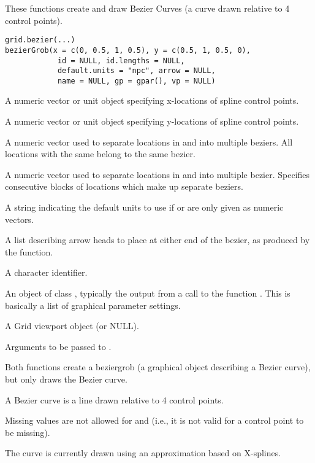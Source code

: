 %
\begin{Description}\relax
These functions create and draw Bezier Curves (a curve drawn
relative to 4 control points).
\end{Description}
%
\begin{Usage}
\begin{verbatim}
grid.bezier(...)
bezierGrob(x = c(0, 0.5, 1, 0.5), y = c(0.5, 1, 0.5, 0),
            id = NULL, id.lengths = NULL,
            default.units = "npc", arrow = NULL, 
            name = NULL, gp = gpar(), vp = NULL)
\end{verbatim}
\end{Usage}
%
\begin{Arguments}
\begin{ldescription}
\item[\code{x}] A numeric vector or unit object specifying x-locations of
spline control points.
\item[\code{y}] A numeric vector or unit object specifying y-locations of
spline control points.
\item[\code{id}] A numeric vector used to separate locations in  and
 into multiple beziers.  All locations with the same
 belong to the same bezier.
\item[\code{id.lengths}] A numeric vector used to separate locations in  and
 into multiple bezier.  Specifies consecutive blocks of
locations which make up separate beziers.
\item[\code{default.units}] A string indicating the default units to use
if  or 
are only given as numeric vectors. 
\item[\code{arrow}] A list describing arrow heads to place at either end
of the bezier, as produced by the  function.
\item[\code{name}]  A character identifier. 
\item[\code{gp}] An object of class , typically the output
from a call to the function .  This is basically
a list of graphical parameter settings.
\item[\code{vp}] A Grid viewport object (or NULL).
\item[\code{...}] Arguments to be passed to .
\end{ldescription}
\end{Arguments}
%
\begin{Details}\relax
Both functions create a beziergrob (a graphical object describing a
Bezier curve), but only 
draws the Bezier curve.

A Bezier curve is a line drawn relative to 4 control points.  

Missing values are not allowed for  and 
(i.e., it is not valid for a control point to be missing).

The curve is currently drawn using an approximation based on
X-splines.
\end{Details}
